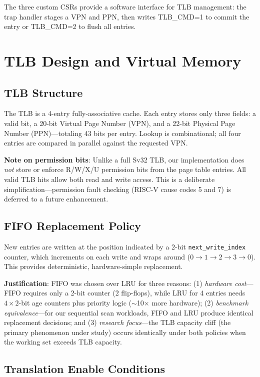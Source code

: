 \documentclass[conference]{IEEEtran}
\begin{document}
The three custom CSRs provide a software interface for TLB management: the trap handler stages a VPN and PPN, then writes TLB\_CMD=1 to commit the entry or TLB\_CMD=2 to flush all entries.

\section{TLB Design and Virtual Memory}

\subsection{TLB Structure}

The TLB is a 4-entry fully-associative cache. Each entry stores only three fields: a valid bit, a 20-bit Virtual Page Number (VPN), and a 22-bit Physical Page Number (PPN)---totaling 43 bits per entry. Lookup is combinational; all four entries are compared in parallel against the requested VPN.

\textbf{Note on permission bits}: Unlike a full Sv32 TLB, our implementation does \textit{not} store or enforce R/W/X/U permission bits from the page table entries. All valid TLB hits allow both read and write access. This is a deliberate simplification---permission fault checking (RISC-V cause codes 5 and 7) is deferred to a future enhancement.

\subsection{FIFO Replacement Policy}

New entries are written at the position indicated by a 2-bit \texttt{next\_write\_index} counter, which increments on each write and wraps around ($0 \rightarrow 1 \rightarrow 2 \rightarrow 3 \rightarrow 0$). This provides deterministic, hardware-simple replacement.

\textbf{Justification}: FIFO was chosen over LRU for three reasons: (1) \textit{hardware cost}---FIFO requires only a 2-bit counter (2 flip-flops), while LRU for 4 entries needs $4 \times 2$-bit age counters plus priority logic ($\sim$10$\times$ more hardware); (2) \textit{benchmark equivalence}---for our sequential scan workloads, FIFO and LRU produce identical replacement decisions; and (3) \textit{research focus}---the TLB capacity cliff (the primary phenomenon under study) occurs identically under both policies when the working set exceeds TLB capacity.

\subsection{Translation Enable Conditions}
\end{document}
